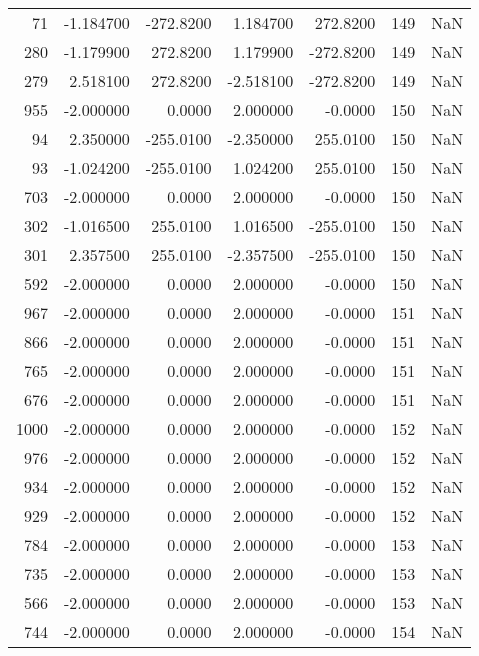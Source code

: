 \begin{tabular}{rrrrrrr}
  71 &   -1.184700 & -272.8200 &    1.184700 &    272.8200 &         149 & NaN \\
 280 &   -1.179900 &  272.8200 &    1.179900 &   -272.8200 &         149 & NaN \\
 279 &    2.518100 &  272.8200 &   -2.518100 &   -272.8200 &         149 & NaN \\
 955 &   -2.000000 &    0.0000 &    2.000000 &     -0.0000 &         150 & NaN \\
  94 &    2.350000 & -255.0100 &   -2.350000 &    255.0100 &         150 & NaN \\
  93 &   -1.024200 & -255.0100 &    1.024200 &    255.0100 &         150 & NaN \\
 703 &   -2.000000 &    0.0000 &    2.000000 &     -0.0000 &         150 & NaN \\
 302 &   -1.016500 &  255.0100 &    1.016500 &   -255.0100 &         150 & NaN \\
 301 &    2.357500 &  255.0100 &   -2.357500 &   -255.0100 &         150 & NaN \\
 592 &   -2.000000 &    0.0000 &    2.000000 &     -0.0000 &         150 & NaN \\
 967 &   -2.000000 &    0.0000 &    2.000000 &     -0.0000 &         151 & NaN \\
 866 &   -2.000000 &    0.0000 &    2.000000 &     -0.0000 &         151 & NaN \\
 765 &   -2.000000 &    0.0000 &    2.000000 &     -0.0000 &         151 & NaN \\
 676 &   -2.000000 &    0.0000 &    2.000000 &     -0.0000 &         151 & NaN \\
1000 &   -2.000000 &    0.0000 &    2.000000 &     -0.0000 &         152 & NaN \\
 976 &   -2.000000 &    0.0000 &    2.000000 &     -0.0000 &         152 & NaN \\
 934 &   -2.000000 &    0.0000 &    2.000000 &     -0.0000 &         152 & NaN \\
 929 &   -2.000000 &    0.0000 &    2.000000 &     -0.0000 &         152 & NaN \\
 784 &   -2.000000 &    0.0000 &    2.000000 &     -0.0000 &         153 & NaN \\
 735 &   -2.000000 &    0.0000 &    2.000000 &     -0.0000 &         153 & NaN \\
 566 &   -2.000000 &    0.0000 &    2.000000 &     -0.0000 &         153 & NaN \\
 744 &   -2.000000 &    0.0000 &    2.000000 &     -0.0000 &         154 & NaN \\

\end{tabular}
